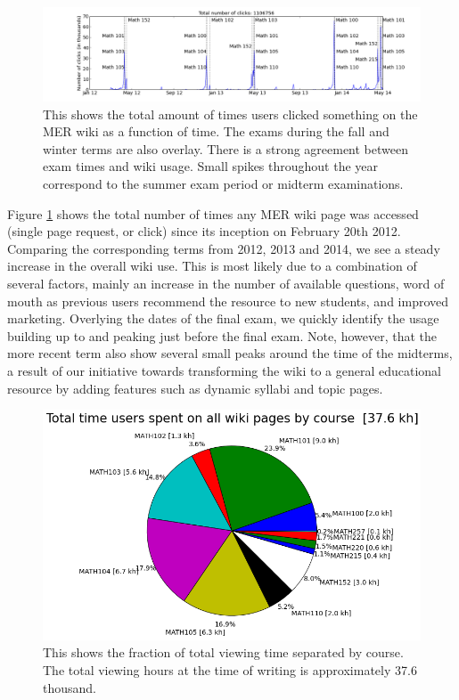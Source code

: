 \documentclass{primus}
\begin{document}
\begin{figure}[H]
\centering
\includegraphics[width=\textwidth]{figs/total_number_of_clicks_time_series.png}
\caption{This shows the total amount of times users clicked something on the MER wiki as a function of time.  The exams during the fall and winter terms are also overlay.  There is a strong agreement between exam times and wiki usage.  Small spikes throughout the year correspond to the summer exam period or midterm examinations.}\label{fig:total_number_of_clicks_time_series}
\end{figure}

\noindent{}Figure \ref{fig:total_number_of_clicks_time_series} shows the total number of times any MER wiki page was accessed (single page request, or click) since its inception on February 20th 2012. Comparing the corresponding terms from 2012, 2013 and 2014, we see a steady increase in the overall wiki use. This is most likely due to a combination of several factors, mainly an increase in the number of available questions, word of mouth as previous users recommend the resource to new students, and improved marketing. Overlying the dates of the final exam, we quickly identify the usage building up to and peaking just before the final exam. Note, however, that the more recent term also show several small peaks around the time of the midterms, a result of our initiative towards transforming the wiki to a general educational resource by adding features such as dynamic syllabi and topic pages.

\begin{figure}[H]
\centering
\includegraphics[width=\textwidth]{figs/total_time_per_course.png}
\caption{This shows the fraction of total viewing time separated by course.  The total viewing hours at the time of writing is approximately 37.6 thousand.}\label{fig:total_time_per_course}
\end{figure}
\end{document}
